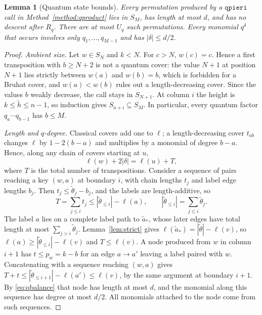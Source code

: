 \documentclass{amsart}
\newtheorem{lemma}[theorem]{Lemma}
\theoremstyle{definition}
\theoremstyle{remark}
\numberwithin{equation}{section}
\begin{document}
\begin{lemma}[Quantum state bounds]\label{lem:qstates}
Every permutation produced by a $\mathtt{qpieri}$ call in
Method~\ref{method:qproduct} lies in $S_M$, has length at most $d$,
and has no descent after $R_q$.
There are at most $U_q$ such permutations.
Every monomial $q^\delta$ that occurs involves only
$q_1,\ldots,q_{M-1}$ and has $|\delta|\leq d/2$.
\end{lemma}
\begin{proof}
\emph{Ambient size.}
Let $w\in S_N$ and $k<N$.
For $c>N$, $w(c)=c$.
Hence a first transposition with $b\geq N+2$ is not a quantum cover:
the value $N+1$ at position $N+1$ lies strictly between $w(a)$ and
$w(b)=b$, which is forbidden for a Bruhat cover, and $w(a)<w(b)$
rules out a length-decreasing cover.
Since the values $b$ weakly decrease, the call stays in $S_{N+1}$.
At column $i$ the height is $k\leq\tilde h\leq n-1$, so induction
gives $S_{n+i}\subseteq S_M$.
In particular, every quantum factor $q_a\cdots q_{b-1}$ has
$b\leq M$.

\emph{Length and $q$-degree.}
Classical covers add one to $\ell$; a length-decreasing cover $t_{ab}$
changes $\ell$ by $1-2(b-a)$ and multiplies by a monomial of degree
$b-a$.
Hence, along any chain of covers starting at $u$,
\begin{equation}\label{eq:qbalance}
 \ell(w)+2|\delta|=\ell(u)+T,
\end{equation}
where $T$ is the total number of transpositions.
Consider a sequence of pairs reaching a key $(w,a)$ at boundary $i$, with
chain lengths $t_j$ and label edge lengths $b_j$.
Then $t_j\leq\tilde\theta_j-b_j$, and the labels are length-additive,
so
\[
 T=\sum_{j\leq i}t_j\leq|\tilde\theta_{\leq i}|-\ell(a),\qquad
 |\tilde\theta_{\leq i}|=\sum_{j\leq i}\tilde\theta_j.
\]
The label $a$ lies on a complete label path to $\tilde a_*$, whose
later edges have total length at most $\sum_{j>i}\tilde\theta_j$.
Lemma~\ref{lem:strict} gives
$\ell(\tilde a_*)=|\tilde\theta|-\ell(v)$, so
$\ell(a)\geq|\tilde\theta_{\leq i}|-\ell(v)$ and $T\leq\ell(v)$.
A node produced from $w$ in column $i+1$ has $t\leq p_w=k-b$ for an
edge $a\to a'$ leaving a label paired with $w$.
Concatenating with a sequence reaching $(w,a)$ gives
$T+t\leq|\tilde\theta_{\leq i+1}|-\ell(a')\leq\ell(v)$, by the same
argument at boundary $i+1$.
By \eqref{eq:qbalance} that node has length at most $d$, and the
monomial along this sequence has degree at most $d/2$.
All monomials attached to the node come from such sequences.


\end{proof}
\end{document}
